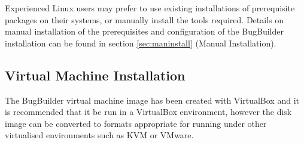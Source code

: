 \documentclass[a4paper,10pt]{article}
\begin{document}
Experienced Linux users may prefer to use existing installations of
prerequisite packages on their systems, or manually install the tools required.
Details on manual installation of the prerequisites and configuration of the
BugBuilder installation can be found in section \ref{sec:maninstall} (Manual
Installation).

\subsection{Virtual Machine Installation}\label{sec:vminstall}

The BugBuilder virtual machine image has been created with VirtualBox and it is
recommended that it be run in a VirtualBox environment, however the disk image
can be converted to formats appropriate for running under other virtualised
environments such as KVM or VMware.
\end{document}
